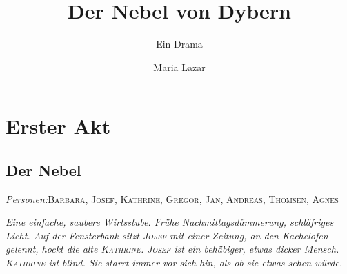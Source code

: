 \documentclass[
	final,
	a4paper,
	ngerman,
	mpinclude = true, %
	twoside = true,
	open = right,
	cleardoublepage = plain,
	DIV = 13,
	BCOR = 1cm,
	titlepage = firstiscover,
	]{scrbook}
\title{Der Nebel von Dybern}
\subtitle{Ein Drama}
\author{Maria Lazar}
\date{\ifdirectorsversion{-- Regie-Version --}{}}
\newcommand{\act}{\chapter}
\newcommand{\scene}{\setcounter{subscene}{1}\section}
\newcommand{\setting}[1]{\vspace{-0.5\baselineskip}\centering\textit{#1}}
\newcounter{subscene}
\newcommand{\characterlist}[1]{{\begin{center}\textit{Personen:}\quad{}#1\end{center}}}
\newcommand{\thecharacter}[1]{\textup{\textsc{#1}}\xspace}
\newcommand{\theBarbara}{\thecharacter{Barbara}}
\newcommand{\theJosef}{\thecharacter{Josef}}
\newcommand{\theKathrine}{\thecharacter{Kathrine}}
\newcommand{\theGregor}{\thecharacter{Gregor}}
\newcommand{\theJan}{\thecharacter{Jan}}
\newcommand{\theAndreas}{\thecharacter{Andreas}}
\newcommand{\theAgnes}{\thecharacter{Agnes}}
\newcommand{\theThomsen}{\thecharacter{Thomsen}}
\begin{document}
%
\cleardoubleoddemptypage

\maketitle

\tableofcontents
\cleardoubleoddpage

\pagestyle{headings}
\doublespacing

\act{Erster Akt}
\scene{Der Nebel}
\label{scene:I}
\characterlist{\theBarbara, \theJosef, \theKathrine, \theGregor, \theJan, \theAndreas, \theThomsen, \theAgnes}
\setting{Eine einfache, saubere Wirtsstube. Frühe Nachmittagsdämmerung, schläfriges Licht. Auf der Fensterbank sitzt \theJosef mit einer Zeitung, an den Kachelofen gelennt, hockt die alte \theKathrine. \theJosef ist ein behäbiger, etwas dicker Mensch. \theKathrine ist blind. Sie starrt immer vor sich hin, als ob sie etwas sehen würde.}
\end{document}
